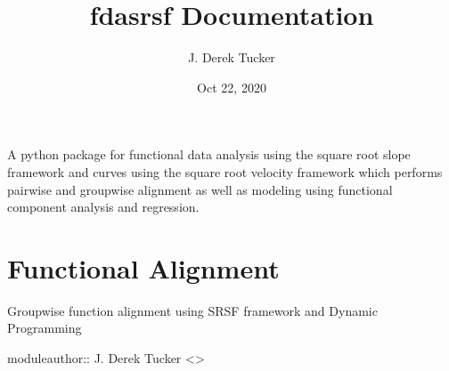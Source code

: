 \documentclass[letterpaper,10pt,english]{sphinxmanual}
\title{fdasrsf Documentation}
\date{Oct 22, 2020}
\author{J. Derek Tucker}
\begin{document}
\pagestyle{empty}
\sphinxmaketitle
\pagestyle{plain}
\sphinxtableofcontents
\pagestyle{normal}
\label{\detokenize{index::doc}}


A python package for functional data analysis using the square root
slope framework and curves using the square root velocity framework
which performs pair\sphinxhyphen{}wise and group\sphinxhyphen{}wise alignment as well as modeling
using functional component analysis and regression.


\chapter{Functional Alignment}
\label{\detokenize{time_warping:module-time_warping}}\label{\detokenize{time_warping:functional-alignment}}\label{\detokenize{time_warping::doc}}
Group\sphinxhyphen{}wise function alignment using SRSF framework and Dynamic Programming

moduleauthor:: J. Derek Tucker \textless{}\textgreater{}
\end{document}
